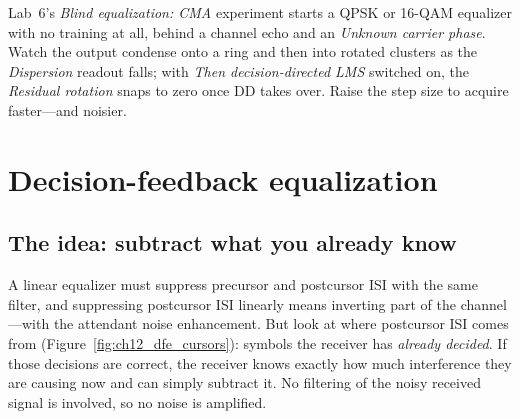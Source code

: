 
\begin{tryit}
Lab~6's \emph{Blind equalization: CMA} experiment starts a QPSK or 16-QAM equalizer with no
training at all, behind a channel echo and an \emph{Unknown carrier phase}. Watch the output condense
onto a ring and then into rotated clusters as the \emph{Dispersion} readout falls; with \emph{Then
decision-directed LMS} switched on, the \emph{Residual rotation} snaps to zero once DD takes over.
Raise the step size to acquire faster---and noisier.
\end{tryit}

\section{Decision-feedback equalization}
\label{sec:ch12:dfe}


\subsection{The idea: subtract what you already know}

A linear equalizer must suppress precursor and postcursor ISI with the same filter, and suppressing
postcursor ISI linearly means inverting part of the channel---with the attendant noise enhancement.
But look at where postcursor ISI comes from (Figure~\ref{fig:ch12_dfe_cursors}): symbols the receiver
has \emph{already decided}. If those decisions are correct, the receiver knows exactly how much
interference they are causing now and can simply subtract it. No filtering of the noisy received
signal is involved, so no noise is amplified.

